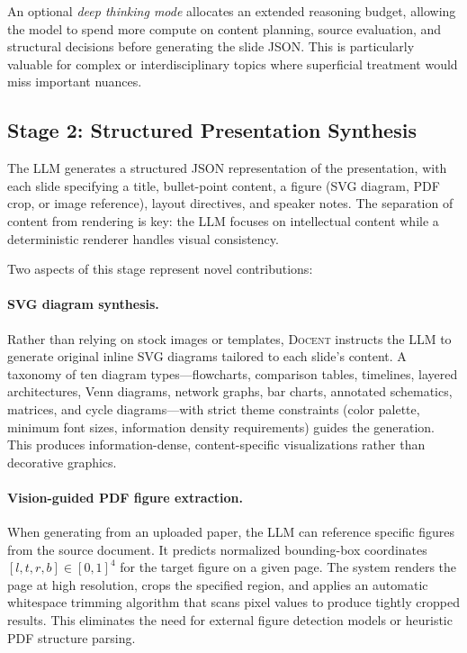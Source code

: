 \documentclass[11pt,a4paper]{article}
\newcommand{\system}{\textsc{Docent}\xspace}
\begin{document}
An optional \emph{deep thinking mode} allocates an extended reasoning budget, allowing the model to spend more compute on content planning, source evaluation, and structural decisions before generating the slide JSON.
This is particularly valuable for complex or interdisciplinary topics where superficial treatment would miss important nuances.

\subsection{Stage 2: Structured Presentation Synthesis}

The LLM generates a structured JSON representation of the presentation, with each slide specifying a title, bullet-point content, a figure (SVG diagram, PDF crop, or image reference), layout directives, and speaker notes.
The separation of content from rendering is key: the LLM focuses on intellectual content while a deterministic renderer handles visual consistency.

Two aspects of this stage represent novel contributions:

\paragraph{SVG diagram synthesis.}
Rather than relying on stock images or templates, \system instructs the LLM to generate original inline SVG diagrams tailored to each slide's content.
A taxonomy of ten diagram types---flowcharts, comparison tables, timelines, layered architectures, Venn diagrams, network graphs, bar charts, annotated schematics, matrices, and cycle diagrams---with strict theme constraints (color palette, minimum font sizes, information density requirements) guides the generation.
This produces information-dense, content-specific visualizations rather than decorative graphics.

\paragraph{Vision-guided PDF figure extraction.}
When generating from an uploaded paper, the LLM can reference specific figures from the source document.
It predicts normalized bounding-box coordinates $[l, t, r, b] \in [0,1]^4$ for the target figure on a given page.
The system renders the page at high resolution, crops the specified region, and applies an automatic whitespace trimming algorithm that scans pixel values to produce tightly cropped results.
This eliminates the need for external figure detection models or heuristic PDF structure parsing.
\end{document}
